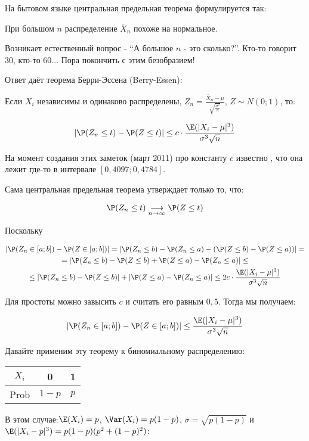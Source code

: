 На бытовом языке центральная предельная теорема формулируется так:

При большом $n$ распределение $\bar{X}_{n}$ похоже на нормальное.

Возникает естественный вопрос - {}``А большое $n$ - это сколько?''.
Кто-то говорит 30, кто-то 60... Пора покончить с этим безобразием!

Ответ даёт теорема Берри-Эссена (Berry-Essen):

Если $X_{i}$ независимы и одинаково распределены, $Z_{n}=\frac{\bar{X}_{n}-\mu}{\sqrt{\frac{\sigma^{2}}{n}}}$,
$Z\sim N(0;1)$, то: 

\begin{equation}
|\P(Z_{n}\leq t)-\P(Z\leq t)|\leq c\cdot\frac{\E(|X_{i}-\mu|^{3})}{\sigma^{3}\sqrt{n}}
\end{equation}


На момент создания этих заметок (март 2011) про константу $c$ известно
, что она лежит где-то в интервале $[0,4097;0,4784]$. 

Сама центральная предельная теорема утверждает только то, что:

\[
\P(Z_{n}\leq t)\underset{n\to\infty}{\longrightarrow}\P(Z\leq t)
\]


Поскольку 

\begin{multline}
|\P(Z_{n}\in[a;b])-\P(Z\in[a;b])|=|\P(Z_{n}\leq b)-\P(Z_{n}\leq a)-(\P(Z\leq b)-\P(Z\leq a))|=\\
=|\P(Z_{n}\leq b)-\P(Z\leq b)+\P(Z\leq a)-\P(Z_{n}\leq a)|\leq\\
\leq|\P(Z_{n}\leq b)-\P(Z\leq b)|+|\P(Z\leq a)-\P(Z_{n}\leq a)|\leq2c\cdot\frac{\E(|X_{i}-\mu|^{3})}{\sigma^{3}\sqrt{n}}
\end{multline}


Для простоты можно завысить $c$ и считать его равным $0,5$. Тогда
мы получаем:

\begin{equation}
|\P(Z_{n}\in[a;b])-\P(Z\in[a;b])|\leq\frac{\E(|X_{i}-\mu|^{3})}{\sigma^{3}\sqrt{n}}\label{eq:ab_error}
\end{equation}


Давайте применим эту теорему к биномиальному распределению:

\begin{tabular}{|c|c|c|}
\hline 
$X_{i}$ & 0 & 1\tabularnewline
\hline 
\hline 
Prob & $1-p$ & $p$\tabularnewline
\hline 
\end{tabular}

В этом случае:$\E(X_{i})=p$, $\Var(X_{i})=p(1-p)$, $\sigma=\sqrt{p(1-p)}$
и $\E(|X_{i}-p|^{3})=p(1-p)(p^{2}+(1-p)^{2})$:

